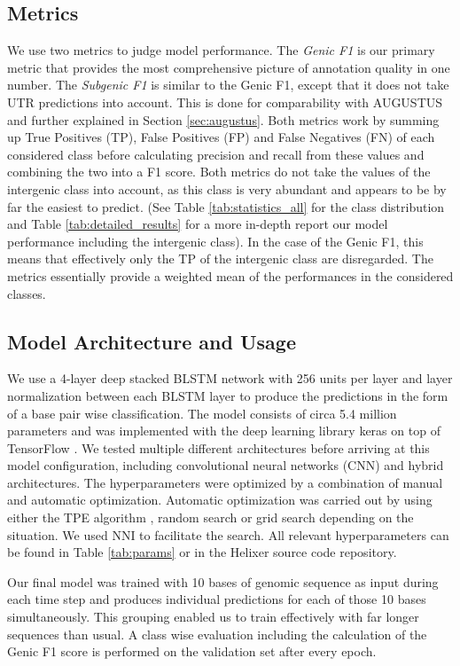 \documentclass{bioinfo}
\begin{document}
\begin{methods}
\subsection{Metrics}
We use two metrics to judge model performance. The {\it Genic F1} is our primary metric that provides the most comprehensive picture of annotation quality in one number. The {\it Subgenic F1} is similar to the Genic F1, except that it does not take UTR predictions into account. This is done for comparability with AUGUSTUS and further explained in Section \ref{sec:augustus}. Both metrics work by summing up True Positives (TP), False Positives (FP) and False Negatives (FN) of each considered class before calculating precision and recall from these values and combining the two into a F1 score. Both metrics do not take the values of the intergenic class into account, as this class is very abundant and appears to be by far the easiest to predict. (See Table \ref{tab:statistics_all} for the class distribution and Table \ref{tab:detailed_results} for a more in-depth report our model performance including the intergenic class). In the case of the Genic F1, this means that effectively only the TP of the intergenic class are disregarded. The metrics essentially provide a weighted mean of the performances in the considered classes. 

	
\subsection{Model Architecture and Usage}
\label{sec:model}
We use a 4-layer deep stacked BLSTM network with 256 units per layer and layer normalization \citep{ba2016layer} between each BLSTM layer to produce the predictions in the form of a base pair wise classification. The model consists of circa 5.4 million parameters and was implemented with the deep learning library keras \citep{chollet2015keras} on top of TensorFlow \citep{abadi2016tensorflow}. We tested multiple different architectures before arriving at this model configuration, including convolutional neural networks (CNN) and hybrid architectures. The hyperparameters were optimized by a combination of manual and automatic optimization. Automatic optimization was carried out by using either the TPE algorithm \citep{bergstra2011algorithms}, random search or grid search depending on the situation. We used NNI \citep{nni2019} to facilitate the search. All relevant hyperparameters can be found in Table \ref{tab:params} or in the Helixer source code repository. 
	
Our final model was trained with 10 bases of genomic sequence as input during each time step and produces individual predictions for each of those 10 bases simultaneously. This grouping enabled us to train effectively with far longer sequences than usual. A class wise evaluation including the calculation of the Genic F1 score is performed on the validation set after every epoch.


\end{methods}
\end{document}

